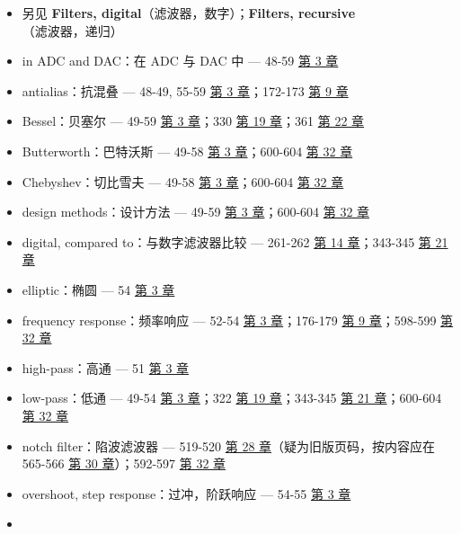 \begin{itemize}
  \begin{itemize}
  \tightlist
  \item
    另见 \textbf{Filters, digital}（滤波器，数字）；\textbf{Filters,
    recursive}（滤波器，递归）
  \item
    in ADC and DAC：在 ADC 与 DAC 中 --- 48-59 
    \hyperref[ch-03]{第 3 章}
  \item
    antialias：抗混叠 --- 48-49, 55-59  \hyperref[ch-03]{第 3
    章}；172-173  \hyperref[ch-09]{第 9 章}
  \item
    Bessel：贝塞尔 --- 49-59  \hyperref[ch-03]{第 3 章}；330
     \hyperref[ch-19]{第 19 章}；361 
    \hyperref[ch-22]{第 22 章}
  \item
    Butterworth：巴特沃斯 --- 49-58  \hyperref[ch-03]{第 3
    章}；600-604  \hyperref[ch-32]{第 32 章}
  \item
    Chebyshev：切比雪夫 --- 49-58  \hyperref[ch-03]{第 3
    章}；600-604  \hyperref[ch-32]{第 32 章}
  \item
    design methods：设计方法 --- 49-59  \hyperref[ch-03]{第 3
    章}；600-604  \hyperref[ch-32]{第 32 章}
  \item
    digital, compared to：与数字滤波器比较 --- 261-262 
    \hyperref[ch-14]{第 14 章}；343-345  \hyperref[ch-21]{第
    21 章}
  \item
    elliptic：椭圆 --- 54  \hyperref[ch-03]{第 3 章}
  \item
    frequency response：频率响应 --- 52-54 
    \hyperref[ch-03]{第 3 章}；176-179  \hyperref[ch-09]{第 9
    章}；598-599  \hyperref[ch-32]{第 32 章}
  \item
    high-pass：高通 --- 51  \hyperref[ch-03]{第 3 章}
  \item
    low-pass：低通 --- 49-54  \hyperref[ch-03]{第 3 章}；322
     \hyperref[ch-19]{第 19 章}；343-345 
    \hyperref[ch-21]{第 21 章}；600-604  \hyperref[ch-32]{第
    32 章}
  \item
    notch filter：陷波滤波器 --- 519-520  \hyperref[ch-28]{第
    28 章}（疑为旧版页码，按内容应在 565-566 
    \hyperref[ch-30]{第 30 章}）；592-597  \hyperref[ch-32]{第
    32 章}
  \item
    overshoot, step response：过冲，阶跃响应 --- 54-55 
    \hyperref[ch-03]{第 3 章}
  \item

\end{itemize}
\end{itemize}
